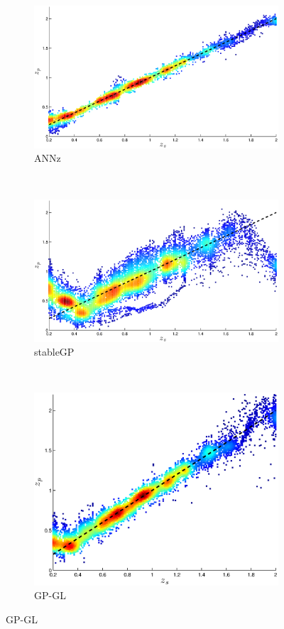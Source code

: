\documentclass[useAMS,usenatbib,fleqn]{mn2e}
\begin{document}
\begin{figure}
        \centering
        \begin{subfigure}[b]{0.3\textwidth}
                \includegraphics[width=\textwidth]{figures/ANN.eps}
                \caption{ANNz}
        \end{subfigure}
        ~
        \begin{subfigure}[b]{0.3\textwidth}
                \includegraphics[width=\textwidth]{figures/stableGP.eps}
                \caption{stableGP}
        \end{subfigure}
        ~
        \begin{subfigure}[b]{0.3\textwidth}
                \includegraphics[width=\textwidth]{figures/GPGL.eps}
                \caption{GP-GL}
        \end{subfigure}
        

\end{figure}
\end{document}
